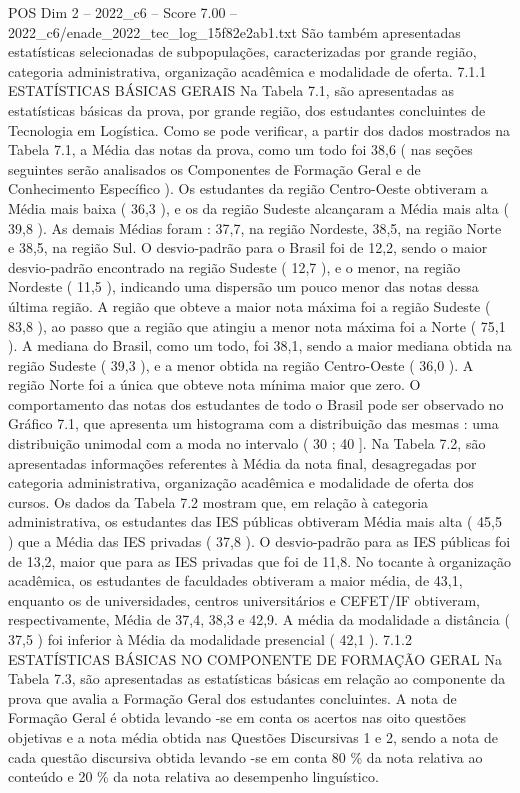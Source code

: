 \begin{textsample}{POS Dim 2 – 2022\_c6 – Score 7.00 – 2022\_c6/enade\_2022\_tec\_log\_15f82e2ab1.txt}
São também apresentadas estatísticas selecionadas de subpopulações, caracterizadas por grande região, categoria administrativa, organização acadêmica e modalidade de oferta. 7.1.1 ESTATÍSTICAS BÁSICAS GERAIS Na Tabela 7.1, são apresentadas as estatísticas básicas da prova, por grande região, dos estudantes concluintes de Tecnologia em Logística.
Como se pode verificar, a partir dos dados mostrados na Tabela 7.1, a Média das notas da prova, como um todo foi 38,6 ( nas seções seguintes serão analisados os Componentes de Formação Geral e de Conhecimento Específico ).
Os estudantes da região Centro-Oeste obtiveram a Média mais baixa ( 36,3 ), e os da região Sudeste alcançaram a Média mais alta ( 39,8 ).
As demais Médias foram : 37,7, na região Nordeste, 38,5, na região Norte e 38,5, na região Sul.
O desvio-padrão para o Brasil foi de 12,2, sendo o maior desvio-padrão encontrado na região Sudeste ( 12,7 ), e o menor, na região Nordeste ( 11,5 ), indicando uma dispersão um pouco menor das notas dessa última região.
A região que obteve a maior nota máxima foi a região Sudeste ( 83,8 ), ao passo que a região que atingiu a menor nota máxima foi a Norte ( 75,1 ).
A mediana do Brasil, como um todo, foi 38,1, sendo a maior mediana obtida na região Sudeste ( 39,3 ), e a menor obtida na região Centro-Oeste ( 36,0 ).
A região Norte foi a única que obteve nota mínima maior que zero.
O comportamento das notas dos estudantes de todo o Brasil pode ser observado no Gráfico 7.1, que apresenta um histograma com a distribuição das mesmas : uma distribuição unimodal com a moda no intervalo ( 30 ; 40 ].
Na Tabela 7.2, são apresentadas informações referentes à Média da nota final, desagregadas por categoria administrativa, organização acadêmica e modalidade de oferta dos cursos.
Os dados da Tabela 7.2 mostram que, em relação à categoria administrativa, os estudantes das IES públicas obtiveram Média mais alta ( 45,5 ) que a Média das IES privadas ( 37,8 ).
O desvio-padrão para as IES públicas foi de 13,2, maior que para as IES privadas que foi de 11,8.
No tocante à organização acadêmica, os estudantes de faculdades obtiveram a maior média, de 43,1, enquanto os de universidades, centros universitários e CEFET/IF obtiveram, respectivamente, Média de 37,4, 38,3 e 42,9.
A média da modalidade a distância ( 37,5 ) foi inferior à Média da modalidade presencial ( 42,1 ). 7.1.2 ESTATÍSTICAS BÁSICAS NO COMPONENTE DE FORMAÇÃO GERAL Na Tabela 7.3, são apresentadas as estatísticas básicas em relação ao componente da prova que avalia a Formação Geral dos estudantes concluintes.
A nota de Formação Geral é obtida levando -se em conta os acertos nas oito questões objetivas e a nota média obtida nas Questões Discursivas 1 e 2, sendo a nota de cada questão discursiva obtida levando -se em conta 80 \% da nota relativa ao conteúdo e 20 \% da nota relativa ao desempenho linguístico.

\end{textsample}
